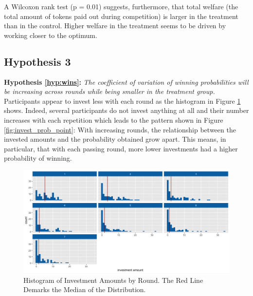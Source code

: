 A Wilcoxon rank test (p = 0.01) suggests, furthermore, that total welfare (the total amount of tokens paid out during competition) is larger in the treatment than in the control. Higher welfare in the treatment seems to be driven by working closer to the optimum.\\ 

\subsection{Hypothesis 3}

\textbf{Hypothesis \ref{hyp:wins}:} \textit{The coefficient of variation of winning probabilities will be increasing across rounds while being smaller in the treatment group.}\\

Participants appear to invest less with each round as the histogram in Figure \ref{fig:invest_hist} shows. Indeed, several participants do not invest anything at all and their number increases with each repetition which leads to the pattern shown in Figure \ref{fig:invest_prob_point}: With increasing rounds, the relationship between the invested amounts and the probability obtained grow apart. This means, in particular, that with each passing round, more lower investments had a higher probability of winning.\\

\begin{figure}
    \centering
    \includegraphics[width=\textwidth]{graphs/investment_amount_hist.png}
    \caption{Histogram of Investment Amounts by Round. The Red Line Demarks the Median of the Distribution.}
    \label{fig:invest_hist}
\end{figure}

